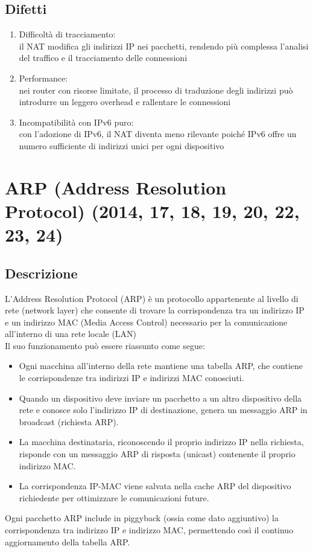 \documentclass[10pt,oneside,a4paper]{article}
\begin{document}
\subsection{Difetti}
\begin{enumerate}
\item Difficoltà di tracciamento:\\
il NAT modifica gli indirizzi IP nei pacchetti, rendendo più complessa l'analisi del traffico e il tracciamento delle connessioni
\item Performance:\\
nei router con risorse limitate, il processo di traduzione degli indirizzi può introdurre un leggero overhead e rallentare le connessioni
\item Incompatibilità con IPv6 puro:\\
con l'adozione di IPv6, il NAT diventa meno rilevante poiché IPv6 offre un numero sufficiente di indirizzi unici per ogni dispositivo
\end{enumerate}
\section{ARP (Address Resolution Protocol) (2014, 17, 18, 19, 20, 22, 23, 24)}
\subsection{Descrizione}
L'Address Resolution Protocol (ARP) è un protocollo appartenente al livello di rete (network layer) che consente di trovare la corrispondenza tra un indirizzo IP e un indirizzo MAC (Media Access Control) necessario per la comunicazione all'interno di una rete locale (LAN)\\
Il suo funzionamento può essere riassunto come segue:
\begin{itemize}
\item Ogni macchina all'interno della rete mantiene una tabella ARP, che contiene le corrispondenze tra indirizzi IP e indirizzi MAC conosciuti.
\item Quando un dispositivo deve inviare un pacchetto a un altro dispositivo della rete e conosce solo l'indirizzo IP di destinazione, genera un messaggio ARP in broadcast (richiesta ARP).
\item La macchina destinataria, riconoscendo il proprio indirizzo IP nella richiesta, risponde con un messaggio ARP di risposta (unicast) contenente il proprio indirizzo MAC.
\item La corrispondenza IP-MAC viene salvata nella cache ARP del dispositivo richiedente per ottimizzare le comunicazioni future.
\end{itemize}
Ogni pacchetto ARP include in piggyback (ossia come dato aggiuntivo) la corrispondenza tra indirizzo IP e indirizzo MAC, permettendo così il continuo aggiornamento della tabella ARP.
\end{document}
